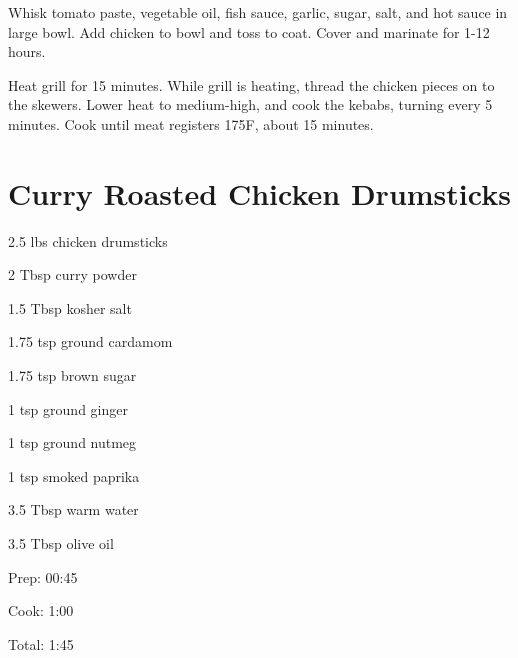 \documentclass[oneside]{book}  %
\def\thisrecipe{}  %
\newcommand{\recipe}[1]{\section{#1}\def\thisrecipe{: #1}} %
\newcommand{\degF}{\textdegree F\xspace}
\begin{document}
\begin{directions}
  \item Whisk tomato paste, vegetable oil, fish sauce, garlic, sugar, salt, and
  hot sauce in large bowl. Add chicken to bowl and toss to coat. Cover and
  marinate for 1-12 hours.

  \item Heat grill for 15 minutes. While grill is heating, thread the chicken
  pieces on to the skewers. Lower heat to medium-high, and cook the kebabs,
  turning every 5 minutes. Cook until meat registers 175\degF, about 15 minutes.
\end{directions}
\recipe{Curry Roasted Chicken Drumsticks} \label{recipe:curry_roasted_chicken_drumsticks} %

\begin{IT}
  \begin{ingredients}
    \item[2.5 lbs] chicken drumsticks
    \item[2 Tbsp] curry powder
    \item[1.5 Tbsp] kosher salt
    \item[1.75 tsp] ground cardamom
    \item[1.75 tsp] brown sugar
    \item[1 tsp] ground ginger
    \item[1 tsp] ground nutmeg
    \item[1 tsp] smoked paprika
    \item[3.5 Tbsp] warm water
    \item[3.5 Tbsp] olive oil
  \end{ingredients}

  \switchcolumn

  \begin{timeline}
    \item[Prep:]  00:45
    \item[Cook:]  1:00
    \item[Total:] 1:45
  \end{timeline}
\end{IT}
\end{document}
